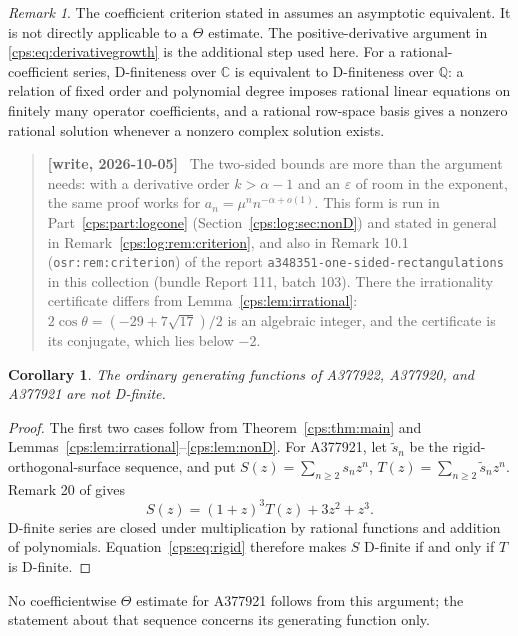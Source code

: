 \documentclass[11pt,letterpaper]{article}
\numberwithin{equation}{section}
\newtheorem{corollary}[theorem]{Corollary}
\theoremstyle{remark}\newtheorem{remark}[theorem]{Remark}
\newcommand{\repo}[1]{\nolinkurl{#1}}
\newenvironment{writenotelog}{\begin{quote}\small\sloppy\textbf{[write, 2026-10-05]}\ }{\end{quote}}
\begin{document}
\begin{remark}
The coefficient criterion stated in \cite[Theorem 2]{BRS} assumes an asymptotic equivalent. It is not directly applicable to a $\Theta$ estimate. The positive-derivative argument in \eqref{cps:eq:derivativegrowth} is the additional step used here. For a rational-coefficient series, D-finiteness over $\mathbb C$ is equivalent to D-finiteness over $\mathbb Q$: a relation of fixed order and polynomial degree imposes rational linear equations on finitely many operator coefficients, and a rational row-space basis gives a nonzero rational solution whenever a nonzero complex solution exists.
\end{remark}

\begin{writenotelog}
The two-sided bounds are more than the argument needs: with a derivative order $k>\alpha-1$
and an $\varepsilon$ of room in the exponent, the same proof works for
$a_n=\mu^nn^{-\alpha+o(1)}$. This form is run in Part~\ref{cps:part:logcone}
(Section~\ref{cps:log:sec:nonD}) and stated in general in Remark~\ref{cps:log:rem:criterion}, and
also in Remark 10.1 (\texttt{osr:rem:criterion}) of the report
\repo{a348351-one-sided-rectangulations} in this collection (bundle Report 111, batch 103).
There the irrationality certificate differs from Lemma~\ref{cps:lem:irrational}:
$2\cos\theta=(-29+7\sqrt{17})/2$ is an algebraic integer, and the certificate is its conjugate,
which lies below $-2$.
\end{writenotelog}

\begin{corollary}\label{cps:cor:nonD}
The ordinary generating functions of A377922, A377920, and A377921 are not D-finite.
\end{corollary}
\begin{proof}
The first two cases follow from Theorem~\ref{cps:thm:main} and Lemmas~\ref{cps:lem:irrational}--\ref{cps:lem:nonD}. For A377921, let $\widetilde s_n$ be the rigid-orthogonal-surface sequence, and put
$S(z)=\sum_{n\ge2}s_nz^n$, $T(z)=\sum_{n\ge2}\widetilde s_nz^n$. Remark 20 of \cite{FNS} gives
\begin{equation}\label{cps:eq:rigid}
 S(z)=(1+z)^3T(z)+3z^2+z^3.
\end{equation}
D-finite series are closed under multiplication by rational functions and addition of polynomials. Equation~\eqref{cps:eq:rigid} therefore makes $S$ D-finite if and only if $T$ is D-finite.
\end{proof}
No coefficientwise $\Theta$ estimate for A377921 follows from this argument; the statement about that sequence concerns its generating function only.
\end{document}
